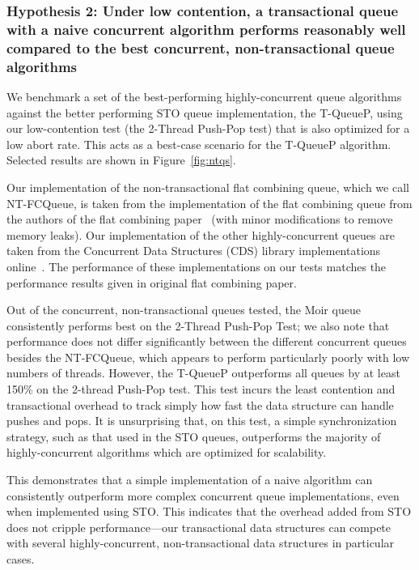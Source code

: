 \subsubsection{Hypothesis 2: Under low contention, a transactional queue with a naive concurrent algorithm performs reasonably well compared to the best concurrent, non-transactional queue algorithms}

We benchmark a set of the best-performing highly-concurrent queue algorithms against the better performing STO queue implementation, the T-QueueP, using our low-contention test (the 2-Thread Push-Pop test) that is also optimized for a low abort rate. This acts as a best-case scenario for the T-QueueP algorithm. Selected results are shown in Figure~\ref{fig:ntqs}.

Our implementation of the non-transactional flat combining queue, which we call NT-FCQueue, is taken from the implementation of the flat combining queue from the authors of the flat combining paper~\cite{flatcombining} (with minor modifications to remove memory leaks). Our implementation of the other highly-concurrent queues are taken from the Concurrent Data Structures (CDS) library implementations online~\cite{libcds}. The performance of these implementations on our tests matches the performance results given in original flat combining paper. 

Out of the concurrent, non-transactional queues tested, the Moir queue~\cite{queue2} consistently performs best on the 2-Thread Push-Pop Test; we also note that performance does not differ significantly between the different concurrent queues besides the NT-FCQueue, which appears to perform particularly poorly with low numbers of threads. However, the T-QueueP outperforms all queues by at least 150\% on the 2-thread Push-Pop test. This test incurs the least contention and transactional overhead to track simply how fast the data structure can handle pushes and pops. It is unsurprising that, on this test, a simple synchronization strategy, such as that used in the STO queues, outperforms the majority of highly-concurrent algorithms which are optimized for scalability. 

This demonstrates that a simple implementation of a naive algorithm can consistently outperform more complex concurrent queue implementations, even when implemented using STO. This indicates that the overhead added from STO does not cripple performance---our transactional data structures can compete with several highly-concurrent, non-transactional data structures in particular cases. 

